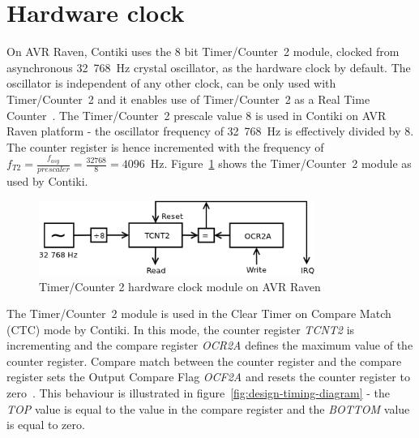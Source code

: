 
\section{Hardware clock}\label{sec:analysis-hwclock}
On AVR Raven, Contiki uses the 8 bit Timer/Counter~2 module,
clocked from asynchronous 32~768~Hz crystal oscillator, as the hardware clock by default.
The oscillator is independent of any other clock,
can be only used with Timer/Counter~2 and it
enables use of Timer/Counter~2 as a Real Time Counter~\cite{avr-datasheet}.
The Timer/Counter~2 prescale value 8 is used in Contiki on AVR Raven platform -
the oscillator frequency of 32~768~Hz is effectively divided by 8.
The counter register is hence incremented with the frequency of
$f_{T2} = {\frac{f_{asy}}{prescaler}} = {\frac{32768}{8}} = 4096$~Hz.
Figure~\ref{fig:avr-clock} shows the Timer/Counter~2 module as used by Contiki.
\begin{figure}
  \centering
  \includegraphics[width=9cm,keepaspectratio]{fig/avr-clock.png}
  \caption{Timer/Counter 2 hardware clock module on AVR Raven}
  \label{fig:avr-clock}
\end{figure}


The Timer/Counter~2 module is used in the Clear Timer on Compare Match (CTC) mode by Contiki.
In this mode, the counter register {\it{TCNT2}} is incrementing
and the compare register {\it{OCR2A}} defines the maximum value of the counter register.
Compare match between the counter register and the compare register
sets the Output Compare Flag {\it{OCF2A}} and resets the counter register to zero~\cite{avr-datasheet}.
This behaviour is illustrated in figure~\ref{fig:design-timing-diagram}
- the {\it{TOP}} value is equal to the value in the compare register and the {\it{BOTTOM}} value is equal to zero.

